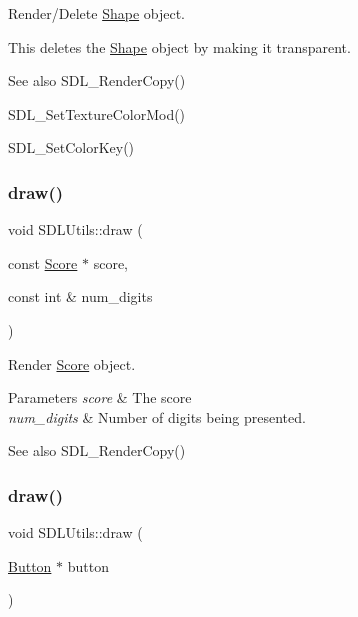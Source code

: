 Render/\+Delete \mbox{\hyperlink{class_shape}{Shape}} object. 

This deletes the \mbox{\hyperlink{class_shape}{Shape}} object by making it transparent. \begin{DoxySeeAlso}{See also}
S\+D\+L\+\_\+\+Render\+Copy() 

S\+D\+L\+\_\+\+Set\+Texture\+Color\+Mod() 

S\+D\+L\+\_\+\+Set\+Color\+Key() 
\end{DoxySeeAlso}
\mbox{\label{class_s_d_l_utils_a7a7ae5762a5e1b178d9ffa94645cfcdc}} 
\subsubsection{\texorpdfstring{draw()}{draw()}\hspace{0.1cm}{\footnotesize\ttfamily [4/6]}}
{\footnotesize\ttfamily void S\+D\+L\+Utils\+::draw (\begin{DoxyParamCaption}\item[{const \mbox{\hyperlink{class_score}{Score}} $\ast$}]{score,  }\item[{const int \&}]{num\+\_\+digits }\end{DoxyParamCaption})\hspace{0.3cm}{\ttfamily [inline]}}



Render \mbox{\hyperlink{class_score}{Score}} object. 


\begin{DoxyParams}{Parameters}
{\em score} & The score \\
\hline
{\em num\+\_\+digits} & Number of digits being presented. \\
\hline
\end{DoxyParams}
\begin{DoxySeeAlso}{See also}
S\+D\+L\+\_\+\+Render\+Copy() 
\end{DoxySeeAlso}
\mbox{\label{class_s_d_l_utils_a2a500a3fe7aa85ddc32ec86afdd8edb2}} 
\subsubsection{\texorpdfstring{draw()}{draw()}\hspace{0.1cm}{\footnotesize\ttfamily [5/6]}}
{\footnotesize\ttfamily void S\+D\+L\+Utils\+::draw (\begin{DoxyParamCaption}\item[{\mbox{\hyperlink{class_button}{Button}} $\ast$}]{button }\end{DoxyParamCaption})\hspace{0.3cm}{\ttfamily [inline]}}



